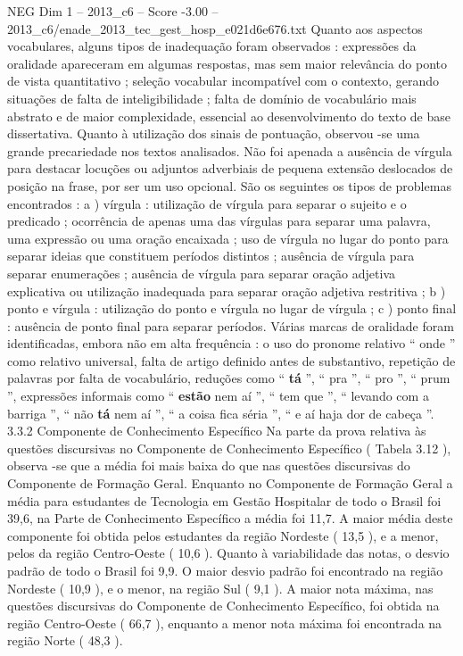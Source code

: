 \begin{textsample}{NEG Dim 1 – 2013\_c6 – Score -3.00 – 2013\_c6/enade\_2013\_tec\_gest\_hosp\_e021d6e676.txt}
Quanto aos aspectos vocabulares, alguns tipos de inadequação foram observados : expressões da oralidade apareceram em algumas respostas, mas sem maior relevância do ponto de vista quantitativo ; seleção vocabular incompatível com o contexto, gerando situações de falta de inteligibilidade ; falta de domínio de vocabulário mais abstrato e de maior complexidade, essencial ao desenvolvimento do texto de base dissertativa.
Quanto à utilização dos sinais de pontuação, observou -se uma grande precariedade nos textos analisados.
Não foi apenada a ausência de vírgula para destacar locuções ou adjuntos adverbiais de pequena extensão deslocados de posição na frase, por ser um uso opcional.
São os seguintes os tipos de problemas encontrados : a ) vírgula : utilização de vírgula para separar o sujeito e o predicado ; ocorrência de apenas uma das vírgulas para separar uma palavra, uma expressão ou uma oração encaixada ; uso de vírgula no lugar do ponto para separar ideias que constituem períodos distintos ; ausência de vírgula para separar enumerações ; ausência de vírgula para separar oração adjetiva explicativa ou utilização inadequada para separar oração adjetiva restritiva ; b ) ponto e vírgula : utilização do ponto e vírgula no lugar de vírgula ; c ) ponto final : ausência de ponto final para separar períodos.
Várias marcas de oralidade foram identificadas, embora não em alta frequência : o uso do pronome relativo “ onde ” como relativo universal, falta de artigo definido antes de substantivo, repetição de palavras por falta de vocabulário, reduções como “ \textbf{tá} ”, “ pra ”, “ pro ”, “ prum ”, expressões informais como “ \textbf{estão} nem aí ”, “ tem que ”, “ levando com a barriga ”, “ não \textbf{tá} nem aí ”, “ a coisa fica séria ”, “ e aí haja dor de cabeça ”. 3.3.2 Componente de Conhecimento Específico Na parte da prova relativa às questões discursivas no Componente de Conhecimento Específico ( Tabela 3.12 ), observa -se que a média foi mais baixa do que nas questões discursivas do Componente de Formação Geral.
Enquanto no Componente de Formação Geral a média para estudantes de Tecnologia em Gestão Hospitalar de todo o Brasil foi 39,6, na Parte de Conhecimento Específico a média foi 11,7.
A maior média deste componente foi obtida pelos estudantes da região Nordeste ( 13,5 ), e a menor, pelos da região Centro-Oeste ( 10,6 ).
Quanto à variabilidade das notas, o desvio padrão de todo o Brasil foi 9,9.
O maior desvio padrão foi encontrado na região Nordeste ( 10,9 ), e o menor, na região Sul ( 9,1 ).
A maior nota máxima, nas questões discursivas do Componente de Conhecimento Específico, foi obtida na região Centro-Oeste ( 66,7 ), enquanto a menor nota máxima foi encontrada na região Norte ( 48,3 ).

\end{textsample}
